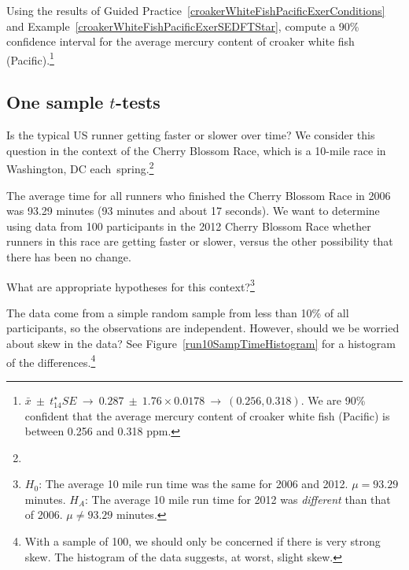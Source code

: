 \begin{exercise}
Using the results of Guided Practice~\ref{croakerWhiteFishPacificExerConditions} and Example~\ref{croakerWhiteFishPacificExerSEDFTStar}, compute a 90\% confidence interval for the average mercury content of croaker white fish (Pacific).\footnote{$\bar{x} \ \pm\ t^{\star}_{14} SE \ \to\  0.287 \ \pm\  1.76\times 0.0178\ \to\ (0.256, 0.318)$. We are 90\% confident that the average mercury content of croaker white fish (Pacific) is between 0.256 and 0.318 ppm.}


\end{exercise}



\subsection{One sample $t$-tests}
\label{oneSampleTTests}

Is the typical US runner getting faster or slower over time? We consider this question in the context of the Cherry Blossom Race, which is a 10-mile race in Washington, DC each~spring.\footnote{}

The average time for all runners who finished the Cherry Blossom Race in 2006 was 93.29 minutes (93 minutes and about 17 seconds). We want to determine using data from 100 participants in the 2012 Cherry Blossom Race whether runners in this race are getting faster or slower, versus the other possibility that there has been no change.

\begin{exercise}
What are appropriate hypotheses for this context?\footnote{$H_0$: The average 10 mile run time was the same for 2006 and 2012. $\mu = 93.29$ minutes. $H_A$: The average 10 mile run time for 2012 was \emph{different} than that of 2006. $\mu \neq 93.29$ minutes.}
\end{exercise}

\begin{exercise}
The data come from a simple random sample from less than 10\% of all participants, so the observations are independent. However, should we be worried about skew in the data? See Figure~\ref{run10SampTimeHistogram} for a histogram of the differences.\footnote{With a sample of 100, we should only be concerned if there is very strong skew. The histogram of the data suggests, at worst, slight skew.}
\end{exercise}

